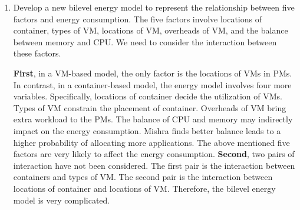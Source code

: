 \begin{enumerate}
	\item Develop a new bilevel energy model to represent the relationship between five factors and energy consumption. The five factors involve locations of container, types of VM, locations of VM, overheads of VM, and the balance between memory and CPU. We need to consider the interaction between these factors.

	\textbf{First}, in a VM-based model, the only factor is the locations of VMs in PMs. In contrast, in a container-based model,  the energy model involves four more variables. Specifically, locations of container decide the utilization of VMs. Types of VM constrain the placement of container. Overheads of VM bring extra workload to the PMs. The balance of CPU and memory may indirectly impact on the energy consumption. Mishra \cite{Mishra:2011bz} finds better balance leads to a higher probability of allocating more applications. The above mentioned five factors are very likely to affect the energy consumption. \textbf{Second}, two pairs of interaction have not been considered. The first pair is the interaction between containers and types of VM. The second pair is the interaction between locations of container and locations of VM. Therefore, the bilevel energy model is very complicated.



\end{enumerate}
